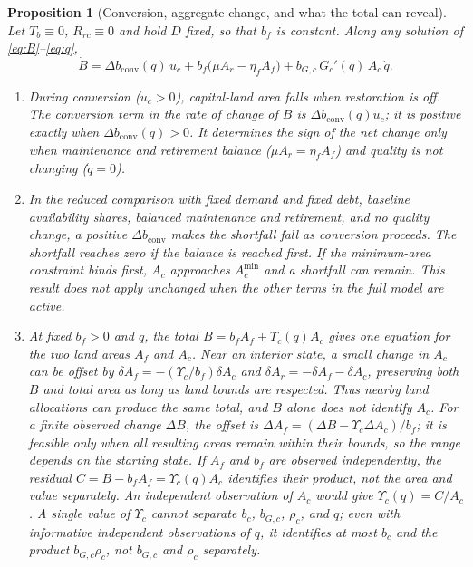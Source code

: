 \documentclass[preprint,12pt,authoryear]{elsarticle}
\newtheorem{proposition}{Proposition}
\newcommand{\dconv}{\Delta b_{\mathrm{conv}}}
\newcommand{\Ups}{\Upsilon_c}
\newcommand{\Acmin}{A_c^{\min}}
\begin{document}
\begin{proposition}[Conversion, aggregate change, and what the total can reveal]\label{prop:mask}
Let $T_b\equiv0$, $R_{rc}\equiv0$ and hold $D$ fixed, so that $b_f$ is constant. Along any solution of \eqref{eq:B}--\eqref{eq:q},
\begin{equation}\label{eq:identity}
\dot B=\dconv(q)\,u_c+b_f\big(\mu A_r-\eta_f A_f\big)+b_{G,c}\,G_c'(q)\,A_c\,\dot q .
\end{equation}
\begin{enumerate}[label=(\roman*)]
\item During conversion ($u_c>0$), capital-land area falls when restoration is off. The conversion term in the rate of change of $B$ is $\dconv(q)u_c$; it is positive exactly when $\dconv(q)>0$. It determines the sign of the net change only when maintenance and retirement balance ($\mu A_r=\eta_fA_f$) and quality is not changing ($\dot q=0$).
\item In the reduced comparison with fixed demand and fixed debt, baseline availability shares, balanced maintenance and retirement, and no quality change, a positive $\dconv$ makes the shortfall fall as conversion proceeds. The shortfall reaches zero if the balance is reached first. If the minimum-area constraint binds first, $A_c$ approaches $\Acmin$ and a shortfall can remain. This result does not apply unchanged when the other terms in the full model are active.
\item At fixed $b_f>0$ and $q$, the total $B=b_fA_f+\Ups(q)A_c$ gives one equation for the two land areas $A_f$ and $A_c$. Near an interior state, a small change in $A_c$ can be offset by $\delta A_f=-(\Ups/b_f)\delta A_c$ and $\delta A_r=-\delta A_f-\delta A_c$, preserving both $B$ and total area as long as land bounds are respected. Thus nearby land allocations can produce the same total, and $B$ alone does not identify $A_c$. For a finite observed change $\Delta B$, the offset is $\Delta A_f=(\Delta B-\Ups\Delta A_c)/b_f$; it is feasible only when all resulting areas remain within their bounds, so the range depends on the starting state. If $A_f$ and $b_f$ are observed independently, the residual $C=B-b_fA_f=\Ups(q)A_c$ identifies their product, not the area and value separately. An independent observation of $A_c$ would give $\Ups(q)=C/A_c$. A single value of $\Ups$ cannot separate $b_c$, $b_{G,c}$, $\rho_c$, and $q$; even with informative independent observations of $q$, it identifies at most $b_c$ and the product $b_{G,c}\rho_c$, not $b_{G,c}$ and $\rho_c$ separately.
\end{enumerate}
\end{proposition}
\end{document}

